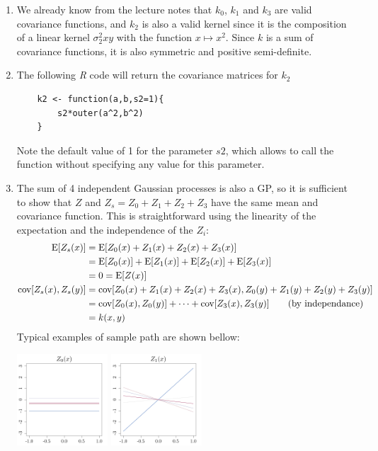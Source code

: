 \documentclass[a4paper,10pt]{article}
\newcommand{\E}{\mbox{E}}
\newcommand{\cov}{\mbox{cov}}
\begin{document}
\begin{enumerate}[label=Q\arabic*.]
\item  We already know from the lecture notes that $k_0$, $k_1$ and $k_3$ are valid covariance functions, and $k_2$ is also a valid kernel since it is the composition of a linear kernel $\sigma_2^2 xy$ with the function $x \mapsto x^2 $. Since $k$ is a sum of covariance functions, it is also symmetric and positive semi-definite.  
\item The following \emph{R} code will return the covariance matrices for $k_2$
\begin{Verbatim}
	k2 <- function(a,b,s2=1){
	    s2*outer(a^2,b^2)
	}
\end{Verbatim}
Note the default value of 1 for the parameter $s2$, which allows to call the function without specifying any value for this parameter.
\item The sum of 4 independent Gaussian processes is also a GP, so it is sufficient to show that $Z$ and $Z_s = Z_0+Z_1+Z_2+Z_3$ have the same mean and covariance function. This is straightforward using the linearity of the expectation and the independence of the $Z_i$:
\begin{align*}
\E [Z_s(x)] &= \E [Z_0(x) + Z_1(x) + Z_2(x) + Z_3(x)] \\
&= \E[Z_0(x)] + \E[Z_1(x)] + \E[Z_2(x)] + \E[Z_3(x)] \\
&= 0 = \E[Z(x)]\\
\cov [Z_s(x),Z_s(y)] &= \cov [ Z_0(x) + Z_1(x) + Z_2(x) + Z_3(x) , Z_0(y) + Z_1(y) + Z_2(y) + Z_3(y)]\\
&= \cov [Z_0(x),Z_0(y)] + \dots + \cov [Z_3(x),Z_3(y)] \text{\qquad (by independance)}\\
&= k(x,y)
\end{align*}
Typical examples of sample path are shown bellow:
\begin{center}
  \includegraphics[width=3.4cm]{figures/samplesZ0.pdf}
  \includegraphics[width=3.4cm]{figures/samplesZ1.pdf} 

\end{center}
\end{enumerate}
\end{document}

